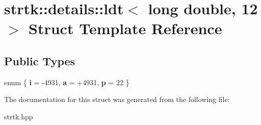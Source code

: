 \hypertarget{structstrtk_1_1details_1_1ldt_3_01long_01double_00_0112_01_4}{\section{strtk\-:\-:details\-:\-:ldt$<$ long double, 12 $>$ Struct Template Reference}
\label{structstrtk_1_1details_1_1ldt_3_01long_01double_00_0112_01_4}
}
\subsection*{Public Types}
\begin{DoxyCompactItemize}
\item 
enum \{ {\bfseries i} = -\/4931, 
{\bfseries a} = +4931, 
{\bfseries p} = 22
 \}
\end{DoxyCompactItemize}


The documentation for this struct was generated from the following file\-:\begin{DoxyCompactItemize}
\item 
strtk.\-hpp\end{DoxyCompactItemize}
